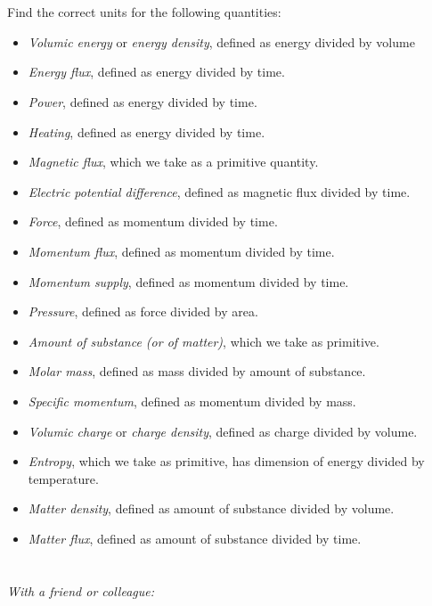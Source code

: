 \documentclass[a4paper,12pt,%
onecolumn,oneside,%
british%
]{memoir}
\renewcommand*{\|}[1][]{\nonscript\:#1\vert\nonscript\:\mathopen{}}
\begin{document}
\section{}
\label{sec:correct_units}

Find the correct units for the following quantities:
\begin{itemize}[noitemsep]
\item \emph{Volumic energy} or \emph{energy density}, defined as energy divided by volume
\item \emph{Energy flux}, defined as energy divided by time.
\item \emph{Power}, defined as energy divided by time.
\item \emph{Heating}, defined as energy divided by time.
\item \emph{Magnetic flux}, which we take as a primitive quantity.
\item \emph{Electric potential difference}, defined as magnetic flux divided by time.
\item \emph{Force}, defined as momentum divided by time.
\item \emph{Momentum flux}, defined as momentum divided by time.
\item \emph{Momentum supply}, defined as momentum divided by time.
\item \emph{Pressure}, defined as force divided by area.
\item \emph{Amount of substance (or of matter)}, which we take as primitive.
\item \emph{Molar mass}, defined as mass divided by amount of substance.
\item \emph{Specific momentum}, defined as momentum divided by mass.
\item \emph{Volumic charge} or \emph{charge density}, defined as charge divided by volume.
\item \emph{Entropy}, which we take as primitive, has dimension of energy divided by temperature.
\item \emph{Matter density}, defined as amount of substance divided by volume.
\item \emph{Matter flux}, defined as amount of substance divided by time.
\end{itemize}

\section{}
\label{sec:explain_primitive}

\emph{With a friend or colleague:}
\end{document}

